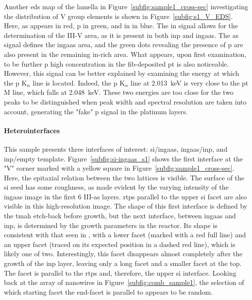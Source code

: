 Another \acs{eds} map of the lamella in Figure~\ref{subfig:sample1_cross-sec} investigating the distribution of V group elements is shown in Figure~\ref{subfig:s1_V_EDS}. Here, \acl{as} appears in red, \acl{p} in green, and \acl{in} in blue. The \acl{in} signal allows for the determination of the III-V area, as it is present in both \acs{inp} and \acs{ingaas}. The \acl{as} signal defines the \acs{ingaas} area, and the green dots revealing the presence of \acl{p} are also present in the remaining \acs{in}-rich area. What appears, upon first examination, to be further \acl{p} high concentration in the \acs{fib}-deposited \acl{pt} is also noticeable. However, this signal can be better explained by examining the energy at which the \acl{p} K\(_\alpha\) line is located. Indeed, the \acs{p} K\(_\alpha\) line at \qty{2.013}{\kilo\eV} is very close to the \acl{pt} M line, which falls at \qty{2.048}{\kilo\eV}. These two energies are too close for the two peaks to be distinguished when peak width and spectral resolution are taken into account, generating the "fake" \acl{p} signal in the platinum layers.
\par
\paragraph{Heterointerfaces}This sample presents three interfaces of interest: \acl{si}/\acs{ingaas}, \acs{ingaas}/\acs{inp}, and \acs{inp}/empty template. Figure~\ref{subfig:si-ingaas_s1} shows the first interface at the "V" corner marked with a yellow square in Figure~\ref{subfig:sample1_cross-sec}. Here, the epitaxial relation between the two lattices is visible. The surface of the \acl{si} seed has some roughness, as made evident by the varying intensity of the \acs{ingaas} image in the first \num{6} III-\acs{as} layers. \Acl{rtp}s parallel to the upper  \acl{si} facet are also visible in this high-resolution image. The shape of this first interface is defined by the \acs{tmah} etch-back before growth, but the next interface, between \acs{ingaas} and \acs{inp}, is determined by the growth parameters in the reactor. Its shape is consistent with that seen in \cite{Scherrer2022, Borg2017, Borg2015}, with a lower  facet (marked with a red full line) and an upper  facet (traced on its expected position in a dashed red line), which is likely one of two. Interestingly, this  facet disappears almost completely after the growth of the \acs{inp} layer, leaving only a long  facet and a smaller  facet at the top. The  facet is parallel to the \acs{rtp}s and, therefore, the upper \acl{si} interface. Looking back at the array of nanowires in Figure~\ref{subfig:comb_sample1}, the selection of which starting  facet the end-facet is parallel to appears to be random.
\par

